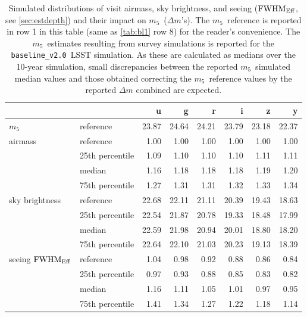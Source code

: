 \documentclass[PST,authoryear,toc]{lsstdoc}
\newcommand{\mf}{\ensuremath{m_5}}
\newcommand{\baseline}{\texttt{baseline\_v2.0}}
\newcommand{\fwhme}{\ensuremath{{\rm FWHM}_\mathrm{Eff}}}
\begin{document}
\begin{table}
\caption{Simulated distributions of visit airmass, sky brightness, and seeing (\fwhme, see \autoref{sec:estdepth}) and their impact on \mf\ ($\Delta m$'s). The \mf\ reference is reported in row 1 in this table (same as \autoref{tab:bl1} row 8) for the reader's convenience. The \mf\ estimates resulting from survey simulations is reported for the \baseline\ LSST simulation. As these are calculated as medians over the 10-year simulation, small discrepancies between the reported \mf\ simulated median values and those obtained correcting the \mf\ reference values by the reported $\Delta m$ combined are expected.}\label{tab:bl2}
    \centering
\begin{tabular}{llrrrrrr}
\hline
{} &&      u &      g &      r &      i &      z &      y \\
\hline
\mf &reference %
&  23.87 &  24.64 &  24.21 &  23.79 &  23.18 &  22.37 \\
\hline
\hline
airmass &reference                 &   1.00 &   1.00 &   1.00 &   1.00 &   1.00 &   1.00 \\
 &25th percentile       &   1.09 &   1.10 &   1.10 &   1.10 &   1.11 &   1.11 \\
 &median                &   1.16 &   1.18 &   1.18 &   1.18 &   1.19 &   1.20 \\
 &75th percentile       &   1.27 &   1.31 &   1.31 &   1.32 &   1.33 &   1.34 \\
\hline
sky brightness& reference           &  22.68 &  22.11 &  21.11 &  20.39 &  19.43 &  18.63 \\
 &25th percentile &  22.54 &  21.87 &  20.78 &  19.33 &  18.48 &  17.99 \\
& median          &  22.59 &  21.98 &  20.94 &  20.01 &  18.80 &  18.20 \\
 &75th percentile &  22.64 &  22.10 &  21.03 &  20.23 &  19.13 &  18.39 \\
\hline
seeing \fwhme& reference             &   1.04 &   0.98 &   0.92 &   0.88 &   0.86 &   0.84 \\
 &25th percentile &   0.97 &   0.93 &   0.88 &   0.85 &   0.83 &   0.82 \\
 &median          &   1.16 &   1.11 &   1.05 &   1.01 &   0.97 &   0.95 \\
 &75th percentile &   1.41 &   1.34 &   1.27 &   1.22 &   1.18 &   1.14 \\


\end{tabular}
\end{table}
\end{document}

